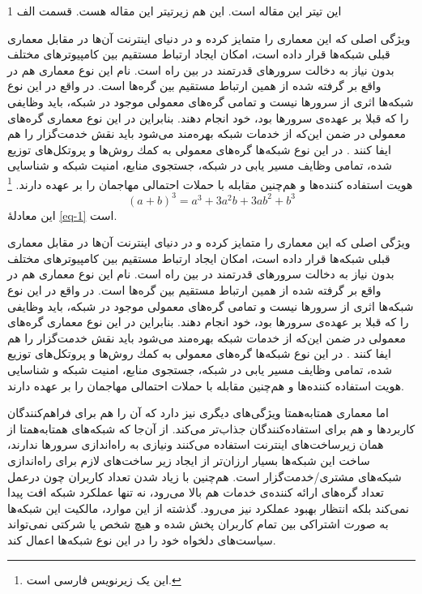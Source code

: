 \documentclass[12pt,twoside]{xepersian-magazine}
\begin{document}
\begin{article}{2}
{این تیتر این مقاله است.}
{این هم زیرتیتر این مقاله هست.}
{قسمت الف}
{1}

\noindent{}
ويژگی اصلی که اين معماری را متمايز کرده و در دنيای اينترنت آن‌ها در مقابل معماری قبلی شبكه‌ها قرار داده است، امكان ايجاد ارتباط مستقيم  بين كامپيوترهای مختلف بدون نياز به دخالت سرورهای قدرتمند در بين راه است.  نام‌ اين نوع معماری هم در واقع بر گرفته شده از همین  ارتباط مستقیم بين گره‌ها است.  در واقع در اين نوع شبكه‌ها اثری از سرورها نيست و تمامی گره‌های معمولی موجود در شبكه، بايد وظايفی را که قبلا بر عهده‌ی سرورها بود، خود انجام دهند. بنابراين در اين نوع معماری گره‌های معمولی در ضمن اين‌که از خدمات شبکه بهره‌مند می‌شود بايد نقش خدمت‌گزار را هم ايفا کنند . در اين نوع شبکه‌ها گره‌های معمولی به كمك روش‌ها و پروتكل‌های توزيع شده، تمامی وظايف  مسير يابی در شبكه، جستجوی منابع، امنيت شبكه و شناسايی هويت استفاده كننده‌ها و هم‌چنين مقابله با حملات احتمالی مهاجمان را بر عهده دارند.
\footnote{این یک زیرنویس فارسی است.}
\begin{equation}
(a+b)^3=a^3+3a^2b+3ab^2+b^3\label{eq-1}
\end{equation}
این معادلهٔ \eqref{eq-1} است.

ويژگی اصلی که اين معماری را متمايز کرده و در دنيای اينترنت آن‌ها در مقابل معماری قبلی شبكه‌ها قرار داده است، امكان ايجاد ارتباط مستقيم  بين كامپيوترهای مختلف بدون نياز به دخالت سرورهای قدرتمند در بين راه است.  نام‌ اين نوع معماری هم در واقع بر گرفته شده از همین  ارتباط مستقیم بين گره‌ها است.  در واقع در اين نوع شبكه‌ها اثری از سرورها نيست و تمامی گره‌های معمولی موجود در شبكه، بايد وظايفی را که قبلا بر عهده‌ی سرورها بود، خود انجام دهند. بنابراين در اين نوع معماری گره‌های معمولی در ضمن اين‌که از خدمات شبکه بهره‌مند می‌شود بايد نقش خدمت‌گزار را هم ايفا کنند . در اين نوع شبکه‌ها گره‌های معمولی به كمك روش‌ها و پروتكل‌های توزيع شده، تمامی وظايف  مسير يابی در شبكه، جستجوی منابع، امنيت شبكه و شناسايی هويت استفاده كننده‌ها و هم‌چنين مقابله با حملات احتمالی مهاجمان را بر عهده دارند.

اما معماری همتابه‌همتا ويژگی‌های ديگری نيز دارد که آن را هم برای فراهم‌کنندگان کاربردها و هم برای استفاده‌کنندگان جذاب‌تر می‌کند.  از آن‌جا که شبکه‌های همتابه‌همتا از همان زيرساخت‌های اينترنت استفاده می‌کنند ونيازی به راه‌اندازی سرورها ندارند، ساخت اين شبكه‌ها بسيار ارزان‌تر از ايجاد زير ساخت‌های لازم برای راه‌اندازی شبكه‌های مشتری/خدمت‌گزار است.  هم‌چنين با زياد شدن تعداد کاربران چون درعمل تعداد گره‌های ارائه کننده‌ی خدمات هم بالا می‌رود، نه تنها عملكرد شبكه افت پيدا نمی‌كند بلكه انتظار بهبود عملکرد نيز می‌رود. گذشته از اين موارد، مالكيت اين شبكه‌ها به صورت اشتراكی بين تمام کاربران پخش شده و هيچ شخص يا شركتی نمی‌تواند سياست‌های دلخواه خود را در اين نوع شبكه‌ها اعمال کند.


\end{article}
\end{document}
